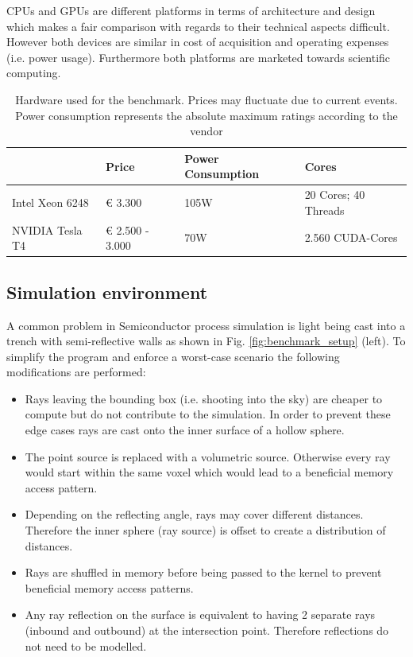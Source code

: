CPUs and GPUs are different platforms in terms of architecture and design which makes a fair comparison with regards to their technical aspects difficult.
However both devices are similar in cost of acquisition and operating expenses (i.e. power usage). 
Furthermore both platforms are marketed towards scientific computing.


\begin{table}[H]

\caption{Hardware used for the benchmark. Prices may fluctuate due to current events. Power consumption represents the absolute maximum ratings according to the vendor}
\centering
\begin{tabular}{@{}llll@{}}
	\toprule
	& Price           & Power Consumption & Cores                \\ \hline
Intel Xeon 6248 & € 3.300         & 105W              & 20 Cores; 40 Threads \\
NVIDIA Tesla T4 & € 2.500 - 3.000 & 70W               & 2.560 CUDA-Cores     \\ \bottomrule
\end{tabular}
\label{tab:hardware}
\end{table}


\subsection{Simulation environment}

A common problem in Semiconductor process simulation is light being cast into a trench with semi-reflective walls as shown in Fig. \ref{fig:benchmark_setup} (left).
To simplify the program and enforce a worst-case scenario the following modifications are performed:

\begin{itemize}
	\item Rays leaving the bounding box (i.e. shooting into the sky) are cheaper to compute but do not contribute to the simulation. 
	In order to prevent these edge cases rays are cast onto the inner surface of a hollow sphere.
	\item The point source is replaced with a volumetric source. Otherwise every ray would start within the same voxel which would lead to a beneficial memory access pattern.
	\item Depending on the reflecting angle, rays may cover different distances. Therefore the inner sphere (ray source) is offset to create a distribution of distances.
	\item Rays are shuffled in memory before being passed to the kernel to prevent beneficial memory access patterns.
	\item Any ray reflection on the surface is equivalent to having 2 separate rays (inbound and outbound) at the intersection point. Therefore reflections do not need to be modelled.
\end{itemize}


